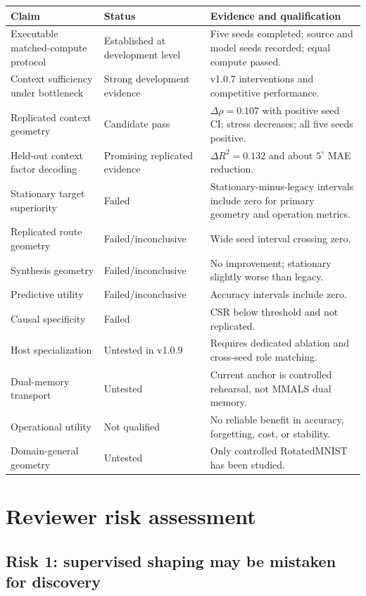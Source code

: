 \documentclass[11pt,a4paper]{article}
\begin{document}
\begin{longtable}{p{}p{}p{}}
\toprule
Claim & Status & Evidence and qualification \\
\midrule
Executable matched-compute protocol & Established at development level & Five seeds completed; source and model seeds recorded; equal compute passed. \\
Context sufficiency under bottleneck & Strong development evidence & v1.0.7 interventions and competitive performance. \\
Replicated context geometry & Candidate pass & $\Delta\rho=0.107$ with positive seed CI; stress decreases; all five seeds positive. \\
Held-out context factor decoding & Promising replicated evidence & $\Delta R^2=0.132$ and about $5^{\circ}$ MAE reduction. \\
Stationary target superiority & Failed & Stationary-minus-legacy intervals include zero for primary geometry and operation metrics. \\
Replicated route geometry & Failed/inconclusive & Wide seed interval crossing zero. \\
Synthesis geometry & Failed/inconclusive & No improvement; stationary slightly worse than legacy. \\
Predictive utility & Failed/inconclusive & Accuracy intervals include zero. \\
Causal specificity & Failed & CSR below threshold and not replicated. \\
Host specialization & Untested in v1.0.9 & Requires dedicated ablation and cross-seed role matching. \\
Dual-memory transport & Untested & Current anchor is controlled rehearsal, not MMALS dual memory. \\
Operational utility & Not qualified & No reliable benefit in accuracy, forgetting, cost, or stability. \\
Domain-general geometry & Untested & Only controlled RotatedMNIST has been studied. \\
\bottomrule
\end{longtable}

\section{Reviewer risk assessment}

\subsection{Risk 1: supervised shaping may be mistaken for discovery}
\end{document}
